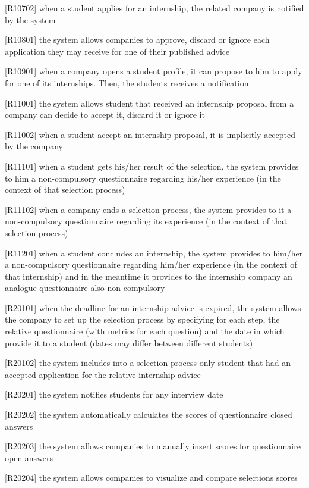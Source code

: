 		[R10702] when a student applies for an internship, the related company is notified by the system
		
		[R10801] the system allows companies to approve, discard or ignore each application they may receive for one of their published advice
		
		[R10901] when a company opens a student profile, it can propose to him to apply for one of its internships. Then, the students receives a notification
		
		[R11001] the system allows student that received an internship proposal from a company can decide to accept it, discard it or ignore it
		
		[R11002] when a student accept an internship proposal, it is implicitly accepted by the company 
		
		[R11101] when a student gets his/her result of the selection, the system provides to him a non-compulsory questionnaire regarding his/her experience (in the context of that selection process)
		
		[R11102] when a company ends a selection process, the system provides to it a non-compulsory questionnaire regarding its experience (in the context of that selection process) 
		
		[R11201] when a student concludes an internship, the system provides to him/her a non-compulsory questionnaire regarding him/her experience (in the context of that internship) and in the meantime it provides to the internship company an analogue questionnaire also non-compulsory 
		
		[R20101] when the deadline for an internship advice is expired, the system allows the company to set up the selection process by specifying for each step, the relative questionnaire (with metrics for each question) and the date in which provide it to a student (dates may differ between different students)
		
		[R20102] the system includes into a selection process only student that had an accepted application for the relative internship advice
		
		[R20201] the system notifies students for any interview date
		
		[R20202] the system automatically calculates the scores of questionnaire closed answers
		
		[R20203] the system allows companies to manually insert scores for questionnaire open answers
		
		[R20204] the system allows companies to visualize and compare selections scores
		
